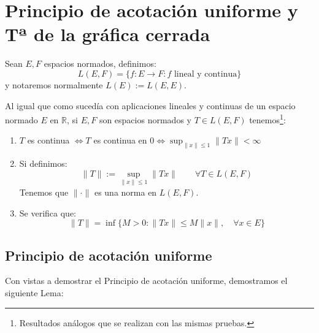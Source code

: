 \chapter{Principio de acotación uniforme y Tª de la gráfica cerrada}
\begin{definicion}
    Sean $E,F$ espacios normados, definimos:
    \begin{equation*}
        L(E,F) = \{f:E\to F : f \text{\ lineal y continua}\}
    \end{equation*}
    y notaremos normalmente $L(E) := L(E,E)$.
\end{definicion}

\begin{prop}
    Al igual que como sucedía con aplicaciones lineales y continuas de un espacio normado $E$ en $\mathbb{R}$, si $E,F$ son espacios normados y $T\in L(E,F)$ tenemos\footnote{Resultados análogos que se realizan con las mismas pruebas.}:
    \begin{enumerate}
        \item $T$ es continua $\Longleftrightarrow T$ es continua en $0 \Longleftrightarrow \sup_{\|x\|\leq 1}\|Tx\| < \infty$
        \item Si definimos:
            \begin{equation*}
                \|T\| := \sup_{\|x\|\leq 1}\|Tx\| \qquad \forall T\in L(E,F)
            \end{equation*}
            Tenemos que $\|\cdot \|$ es una norma en $L(E,F)$.
        \item Se verifica que:
            \begin{equation*}
                \|T\| = \inf\{M>0 : \|Tx\| \leq M\|x\|, \quad \forall x\in E\}
            \end{equation*}
    \end{enumerate}
\end{prop}

\section{Principio de acotación uniforme}
Con vistas a demostrar el Principio de acotación uniforme, demostramos el siguiente Lema:

